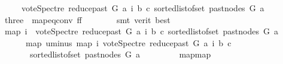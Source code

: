 \begin{isabellebody}
\ \ \ \ {\isacharparenleft}{\kern0pt}{\isacharminus}{\kern0pt}\ vote{\isacharunderscore}{\kern0pt}Spectre\ {\isacharparenleft}{\kern0pt}reduce{\isacharunderscore}{\kern0pt}past\ G\ a{\isacharparenright}{\kern0pt}\ i\ b\ c{\isacharparenright}{\kern0pt}{\isacharparenright}{\kern0pt}\ {\isacharparenleft}{\kern0pt}sorted{\isacharunderscore}{\kern0pt}list{\isacharunderscore}{\kern0pt}of{\isacharunderscore}{\kern0pt}set\ {\isacharparenleft}{\kern0pt}past{\isacharunderscore}{\kern0pt}nodes\ G\ a{\isacharparenright}{\kern0pt}{\isacharparenright}{\kern0pt}{\isacharparenright}{\kern0pt}{\isacharparenright}{\kern0pt}{\isacharparenright}{\kern0pt}{\isachardoublequoteclose}\ \isanewline
\ \ \ \ \ \ \isamarkupfalse%
\ three\ {}\ map{\isacharunderscore}{\kern0pt}eq{\isacharunderscore}{\kern0pt}conv\ ff\isanewline
\ \ \ \ \ \ \isamarkupfalse%
\ {\isacharparenleft}{\kern0pt}smt\ {\isacharparenleft}{\kern0pt}verit{\isacharcomma}{\kern0pt}\ best{\isacharparenright}{\kern0pt}{\isacharparenright}{\kern0pt}\ \ \ \isanewline
\ \ \ \ \isamarkupfalse%
\ {\isachardoublequoteopen}{\isacharparenleft}{\kern0pt}map\ {\isacharparenleft}{\kern0pt}{\isasymlambda}i{\isachardot}{\kern0pt}\ {\isacharminus}{\kern0pt}\ vote{\isacharunderscore}{\kern0pt}Spectre\ {\isacharparenleft}{\kern0pt}reduce{\isacharunderscore}{\kern0pt}past\ G\ a{\isacharparenright}{\kern0pt}\ i\ b\ c{\isacharparenright}{\kern0pt}\ {\isacharparenleft}{\kern0pt}sorted{\isacharunderscore}{\kern0pt}list{\isacharunderscore}{\kern0pt}of{\isacharunderscore}{\kern0pt}set\ {\isacharparenleft}{\kern0pt}past{\isacharunderscore}{\kern0pt}nodes\ G\ a{\isacharparenright}{\kern0pt}{\isacharparenright}{\kern0pt}{\isacharparenright}{\kern0pt}\isanewline
\ \ \ \ \ {\isacharequal}{\kern0pt}\ {\isacharparenleft}{\kern0pt}map\ uminus\ {\isacharparenleft}{\kern0pt}map\ {\isacharparenleft}{\kern0pt}{\isasymlambda}i{\isachardot}{\kern0pt}\ vote{\isacharunderscore}{\kern0pt}Spectre\ {\isacharparenleft}{\kern0pt}reduce{\isacharunderscore}{\kern0pt}past\ G\ a{\isacharparenright}{\kern0pt}\ i\ b\ c{\isacharparenright}{\kern0pt}\isanewline
\ \ \ \ \ \ \ {\isacharparenleft}{\kern0pt}sorted{\isacharunderscore}{\kern0pt}list{\isacharunderscore}{\kern0pt}of{\isacharunderscore}{\kern0pt}set\ {\isacharparenleft}{\kern0pt}past{\isacharunderscore}{\kern0pt}nodes\ G\ a{\isacharparenright}{\kern0pt}{\isacharparenright}{\kern0pt}{\isacharparenright}{\kern0pt}{\isacharparenright}{\kern0pt}{\isachardoublequoteclose}\ \isanewline
\ \ \ \ \ \ \isamarkupfalse%
\ map{\isacharunderscore}{\kern0pt}map\ \isamarkupfalse%

\end{isabellebody}

